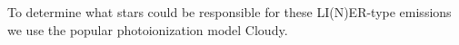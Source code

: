 To determine what stars could be responsible for these LI(N)ER-type emissions we use the popular photoionization model Cloudy. 
